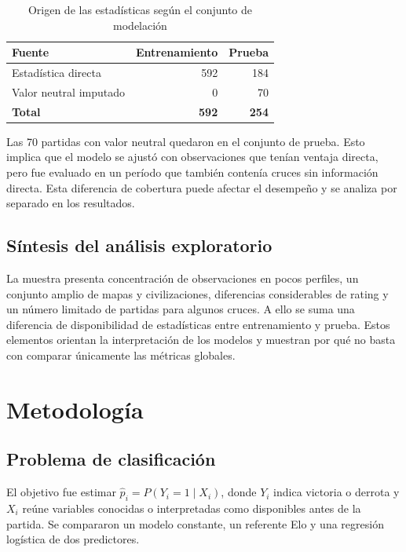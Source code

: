 \documentclass[12pt,a4paper]{article}
\begin{document}
\begin{table}[htbp]
\centering
\caption{Origen de las estadísticas según el conjunto de modelación}
\label{tab:cobertura_split}
\begin{tabular}{lrr}
\toprule
\textbf{Fuente} & \textbf{Entrenamiento} & \textbf{Prueba}\\
\midrule
Estadística directa & 592 & 184\\
Valor neutral imputado & 0 & 70\\
\midrule
\textbf{Total} & \textbf{592} & \textbf{254}\\
\bottomrule
\end{tabular}
\end{table}

Las 70 partidas con valor neutral quedaron en el conjunto de prueba. Esto implica que el modelo se ajustó con observaciones que tenían ventaja directa, pero fue evaluado en un período que también contenía cruces sin información directa. Esta diferencia de cobertura puede afectar el desempeño y se analiza por separado en los resultados.

\subsection{Síntesis del análisis exploratorio}

La muestra presenta concentración de observaciones en pocos perfiles, un conjunto amplio de mapas y civilizaciones, diferencias considerables de rating y un número limitado de partidas para algunos cruces. A ello se suma una diferencia de disponibilidad de estadísticas entre entrenamiento y prueba. Estos elementos orientan la interpretación de los modelos y muestran por qué no basta con comparar únicamente las métricas globales.

\section{Metodología}

\subsection{Problema de clasificación}

El objetivo fue estimar $\hat p_i=P(Y_i=1\mid X_i)$, donde $Y_i$ indica victoria o derrota y $X_i$ reúne variables conocidas o interpretadas como disponibles antes de la partida. Se compararon un modelo constante, un referente Elo y una regresión logística de dos predictores.
\end{document}
